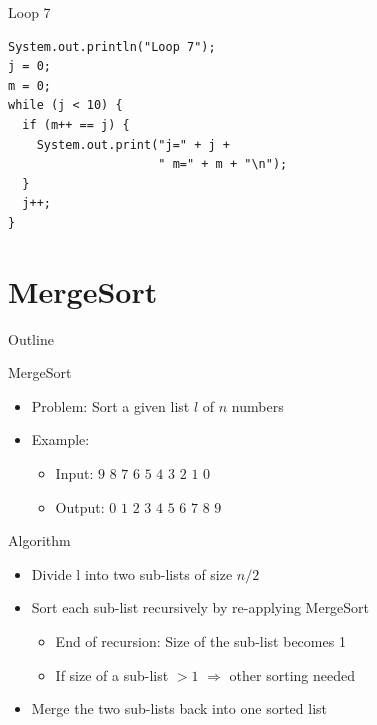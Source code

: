 \begin{frame}[fragile]{Loop 7}
  \begin{lstlisting}
System.out.println("Loop 7");
j = 0;
m = 0;
while (j < 10) {
  if (m++ == j) {
    System.out.print("j=" + j + 
                     " m=" + m + "\n");
  }
  j++;
}
  \end{lstlisting}
\end{frame}


\section{MergeSort}

\begin{frame}{Outline}
  \tableofcontents[current]
\end{frame}

\begin{frame}{MergeSort}
  \begin{itemize}
  \item Problem: Sort a given list $l$ of $n$ numbers
  \item Example:
    \begin{itemize}
    \item Input: $9$ $8$ $7$ $6$ $5$ $4$ $3$ $2$ $1$ $0$
    \item Output: $0$ $1$ $2$ $3$ $4$ $5$ $6$ $7$ $8$ $9$
    \end{itemize}
  \end{itemize}


  \pause

  \begin{exampleblock}{Algorithm}
    \begin{itemize}
    \item Divide l into two sub-lists of size $n/2$
    \item Sort each sub-list recursively by re-applying MergeSort
      \begin{itemize}
      \item End of recursion: Size of the sub-list becomes 1
      \item If size of a sub-list $> 1$ $\Rightarrow$ other sorting
        needed
      \end{itemize}
    \item Merge the two sub-lists back into one sorted list
    \end{itemize}
  \end{exampleblock}
\end{frame}

